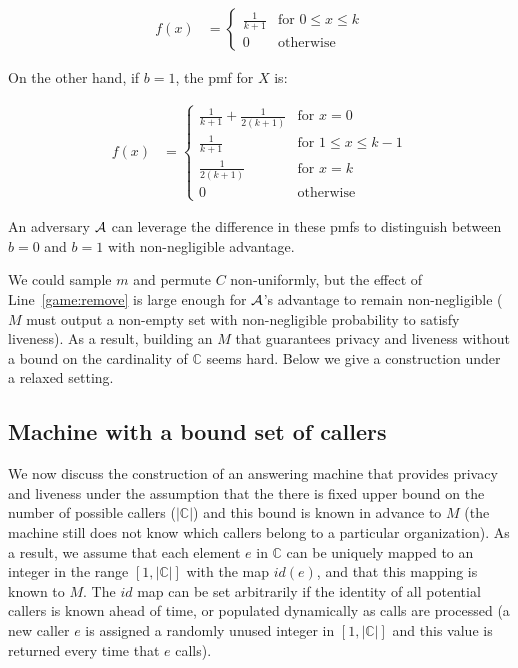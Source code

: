 \begin{equation*}
\begin{split}
  f(x) & = \begin{cases}
    \frac{1}{k+1} & \mbox{for  $0 \leq x \leq k$} \\
    0 & \mbox{otherwise}
    \end{cases}
\end{split}
\end{equation*}

On the other hand, if $b=1$, the pmf for $X$ is:

\begin{equation*}
\begin{split}
  f(x) & = \begin{cases}
    \frac{1}{k+1} + \frac{1}{2(k+1)} & \mbox{for $x = 0$}\\
  \frac{1}{k+1} & \mbox{for $1 \leq x \leq k-1$} \\
  \frac{1}{2(k+1)} & \mbox{for $x = k$}\\
    0 & \mbox{otherwise}
    \end{cases}
\end{split}
\end{equation*}

An adversary $\mathcal{A}$ can leverage the difference in these pmfs 
  to distinguish between $b=0$ and $b=1$ with non-negligible advantage.

We could sample $m$ and permute $C$ non-uniformly, but the effect of 
  Line~\ref{game:remove} is large enough for $\mathcal{A}$'s advantage to remain 
  non-negligible ($M$ must output a non-empty set with non-negligible 
  probability to satisfy liveness).
As a result, building an $M$ that guarantees privacy and liveness without
  a bound on the cardinality of $\mathbb{C}$ seems hard.
Below we give a construction under a relaxed setting.

\subsection{Machine with a bound set of callers}%
\label{s:solutions:bounded}

We now discuss the construction of an answering machine that provides privacy 
  and liveness under the assumption that the there is fixed upper bound on
  the number of possible callers ($|\mathbb{C}|$) and this bound is known 
  in advance to $M$ (the machine still does not know which callers belong to a 
  particular organization).
As a result, we assume that each element $e$ in $\mathbb{C}$ can be uniquely 
  mapped to an integer in the range $[1, |\mathbb{C}|]$ with the map 
  $id(e)$, and that this mapping is known to $M$.
The $id$ map can be set arbitrarily if the identity of all
  potential callers is known ahead of time, or populated dynamically as calls are 
  processed (a new caller $e$ is assigned a randomly unused integer in 
  $[1, |\mathbb{C}|]$ and this value is returned every time that $e$ calls). 
 
